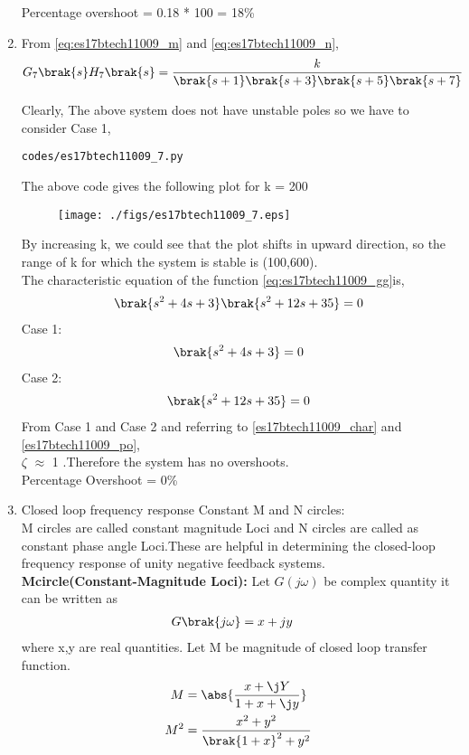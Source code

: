 \begin{enumerate}[label=\thesection.\arabic*.,ref=\thesection.\theenumi]
  Percentage overshoot = 0.18 * 100 = 18\%

\item
From \eqref{eq:es17btech11009_m} and \eqref{eq:es17btech11009_n},
\begin{align}
G_7\brak{s}H_7\brak{s}&= \frac{k}{\brak{s+1}\brak{s+3}\brak{s+5}\brak{s+7}}
\label{eq:es17btech11009_gg}
\end{align}

Clearly, The above system does not have unstable poles so we have to consider Case 1, 

\begin{lstlisting}
codes/es17btech11009_7.py
\end{lstlisting}

The above code gives the following plot for k = 200

\begin{figure}[!h]
\centering
\texttt{[image: ./figs/es17btech11009\_7.eps]}
\caption{}
\label{fig:es17btech11009_fig7}
\end{figure}

By increasing k, we could see that the plot shifts in upward direction, so the range of k for which the system is stable is (100,600).
\\
The characteristic equation of the function \eqref{eq:es17btech11009_gg}is,
\begin{align}
 \brak{s^2 + 4s + 3} \brak{s^2 + 12s + 35} = 0
 \end{align}
 Case 1:
 \begin{align}
 \brak{s^2 + 4s + 3} = 0 
 \end{align}
 Case 2:
 \begin{align}
 \brak{s^2 + 12s + 35} =0
 \end{align}
From Case 1 and Case 2 and referring to \eqref{es17btech11009_char} and \eqref{es17btech11009_po},
\\
  $\zeta$ $\approx$ 1 .Therefore the system has no overshoots.
  \\
  Percentage Overshoot = 0\%
\item
Closed loop frequency response
Constant M and N circles:
\\
\solution 
M circles are called constant magnitude Loci and N circles are called as
constant phase angle Loci.These are helpful in determining the closed-loop frequency response of unity negative feedback systems. \\
\textbf{Mcircle(Constant-Magnitude Loci):} Let $G(j\omega)$ be complex quantity it can be written as 
\begin{align}
G\brak{j \omega} &= x+j y
\end{align}
where x,y are real quantities.
Let M be magnitude of closed loop transfer function.
\begin{align}
M &= \abs{\frac{x+\j Y}{1+x+\j y}}
\\
M^{2} &= \frac{x^{2}+y^{2}}{\brak{1+x}^{2}+y^{2}}
\label{eq:es17btech11009_constm}
\end{align}


\end{enumerate}
